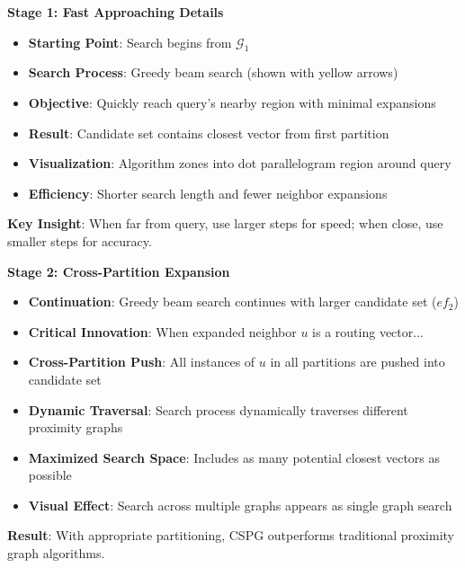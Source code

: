 \begin{frame}
\begin{center}
\LARGE\textbf{Stage 1: Fast Approaching Details}
\end{center}

\vspace{5mm}

\begin{itemize}
    \item \textbf{Starting Point}: Search begins from $\mathcal{G}_1$
    \item \textbf{Search Process}: Greedy beam search (shown with yellow arrows)
    \item \textbf{Objective}: Quickly reach query's nearby region with minimal expansions
    \item \textbf{Result}: Candidate set contains closest vector from first partition
    \item \textbf{Visualization}: Algorithm zones into dot parallelogram region around query
    \item \textbf{Efficiency}: Shorter search length and fewer neighbor expansions
\end{itemize}

\vspace{3mm}
\textbf{Key Insight}: When far from query, use larger steps for speed; when close, use smaller steps for accuracy.
\end{frame}%
\begin{frame}
\begin{center}
\LARGE\textbf{Stage 2: Cross-Partition Expansion}
\end{center}

\vspace{5mm}

\begin{itemize}
    \item \textbf{Continuation}: Greedy beam search continues with larger candidate set ($ef_2$)
    \item \textbf{Critical Innovation}: When expanded neighbor $u$ is a routing vector...
    \item \textbf{Cross-Partition Push}: All instances of $u$ in all partitions are pushed into candidate set
    \item \textbf{Dynamic Traversal}: Search process dynamically traverses different proximity graphs
    \item \textbf{Maximized Search Space}: Includes as many potential closest vectors as possible
    \item \textbf{Visual Effect}: Search across multiple graphs appears as single graph search
\end{itemize}

\vspace{3mm}
\textbf{Result}: With appropriate partitioning, CSPG outperforms traditional proximity graph algorithms.
\end{frame}%
